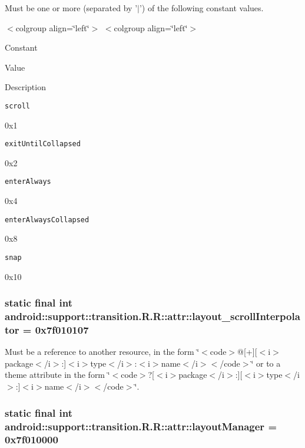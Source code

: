 Must be one or more (separated by '$|$') of the following constant values. \begin{TabularC}{0}
\hline
\end{TabularC}
$<$colgroup align=\char`\"{}left\char`\"{}$>$ $<$colgroup align=\char`\"{}left\char`\"{}$>$ 

Constant

Value

Description 

{\tt scroll}

0x1

{\tt exitUntilCollapsed}

0x2

{\tt enterAlways}

0x4

{\tt enterAlwaysCollapsed}

0x8

{\tt snap}

0x10\hypertarget{classandroid_1_1support_1_1transition_1_1_r_1_1attr_5a8cf38e8e110afabe9c999965ff12d1}{
\subsubsection[{layout\_\-scrollInterpolator}]{\setlength{\rightskip}{0pt plus 5cm}static final int android::support::transition.R.R::attr::layout\_\-scrollInterpolator = 0x7f010107}}
\label{classandroid_1_1support_1_1transition_1_1_r_1_1attr_5a8cf38e8e110afabe9c999965ff12d1}


Must be a reference to another resource, in the form \char`\"{}$<$code$>$@\mbox{[}+\mbox{]}\mbox{[}$<$i$>$package$<$/i$>$:\mbox{]}$<$i$>$type$<$/i$>$:$<$i$>$name$<$/i$>$$<$/code$>$\char`\"{} or to a theme attribute in the form \char`\"{}$<$code$>$?\mbox{[}$<$i$>$package$<$/i$>$:\mbox{]}\mbox{[}$<$i$>$type$<$/i$>$:\mbox{]}$<$i$>$name$<$/i$>$$<$/code$>$\char`\"{}. \hypertarget{classandroid_1_1support_1_1transition_1_1_r_1_1attr_d87d38e1dce19d5b501e04e8121d3af8}{
\subsubsection[{layoutManager}]{\setlength{\rightskip}{0pt plus 5cm}static final int android::support::transition.R.R::attr::layoutManager = 0x7f010000}}
\label{classandroid_1_1support_1_1transition_1_1_r_1_1attr_d87d38e1dce19d5b501e04e8121d3af8}


